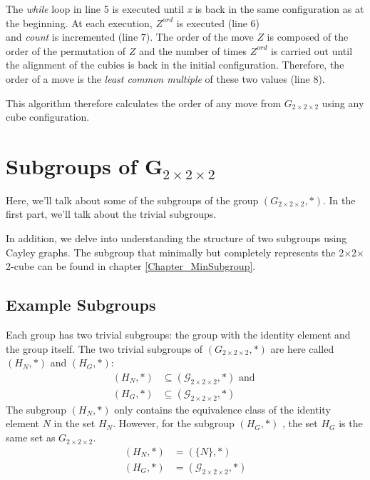 \documentclass[12pt,a4paper]{article}
\theoremstyle{custom}
\newcommand{\Gtwo}{\ensuremath{G_{2\times 2\times 2}}}
\newcommand{\Ttwo}{2$\times$2$\times$2-}
\begin{document}
The \textit{while} loop in line 5 is executed until \textit{x} is back in the same configuration as at the beginning. 
At each execution, $Z^\textit{ord}$ is executed (line 6) \\ and \textit{count} is incremented (line 7).
The order of the move $Z$ is composed of the order of the permutation of $Z$ and the number of times $Z^\textit{ord}$ is carried out until the alignment of the cubies is back in the initial configuration. Therefore, the order of a move is the \textit{least common multiple} of these two values (line 8).

This algorithm therefore calculates the order of any move from $\Gtwo$ using any cube configuration.
\newpage
\section{Subgroups of G$_{2\times 2\times 2}$}


\label{Chapters_Subgroups}

Here, we'll talk about some of the subgroups of the group $\left(\Gtwo, \scriptstyle*\right)$. In the first part, we'll talk about the trivial subgroups.

In addition,  we delve into understanding the structure of two subgroups using  Cayley graphs. The subgroup that minimally but completely represents the \Ttwo cube can be found in chapter \ref{Chapter_MinSubgroup}.

\subsection{Example Subgroups}
\label{Section_SubgroupExamples}

Each group has two trivial subgroups: the group with the identity element and the group itself.  The two trivial subgroups of $(\Gtwo, \scriptstyle *)$ are here called $(H_N, \scriptstyle *)$ and $(H_G, \scriptstyle *)$:
\begin{align*}
(H_N, \scriptstyle*) &\subseteq (\mathcal{G}_{2 \times 2 \times 2}, \scriptstyle *) \text{ and } \\
(H_G, \scriptstyle*) &\subseteq (\mathcal{G}_{2 \times 2 \times 2}, \scriptstyle *)
\end{align*}
The subgroup $\left(H_N, \scriptstyle*\right)$
 only contains the equivalence class of the identity element $N$ in the set $H_N$. However, for the subgroup $\left(H_G, \scriptstyle*\right)$
, the  set $H_G$ is the same set as $\Gtwo$.
\begin{align*}
(H_N, \scriptstyle*) &= (\{N\}, \scriptstyle*)  \\
(H_G, \scriptstyle*) &= (\mathcal{G}_{2 \times 2 \times 2}, \scriptstyle*)
\end{align*}
\end{document}
